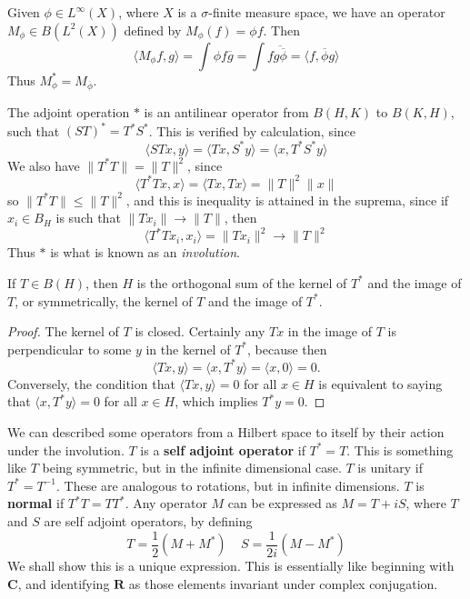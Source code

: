 \begin{example}
    Given $\phi \in L^\infty(X)$, where $X$ is a $\sigma$-finite measure space, we have an operator $M_\phi \in B(L^2(X))$ defined by $M_\phi(f) = \phi f$. Then
    \[ \langle M_\phi f, g \rangle = \int \phi f \overline{g} = \int f \overline{g \overline{\phi}} = \langle f, \overline{\phi} g \rangle \]
    Thus $M_\phi^* = M_{\overline{\phi}}$.
\end{example}

The adjoint operation $*$ is an antilinear operator from $B(H,K)$ to $B(K,H)$, such that $(ST)^* = T^*S^*$. This is verified by calculation, since
%
\[ \langle ST x, y \rangle = \langle Tx, S^* y \rangle = \langle x, T^*S^* y \rangle \]
%
We also have $\| T^*T \| = \| T \|^2$, since
%
\[ \langle T^*T x, x \rangle = \langle Tx, Tx \rangle = \| T \|^2 \| x \| \]
%
so $\| T^*T \| \leq \| T \|^2$, and this is inequality is attained in the suprema, since if $x_i \in B_H$ is such that $\| T x_i \| \to \| T \|$, then
%
\[ \langle T^*T x_i, x_i \rangle = \| T x_i \|^2 \to \| T \|^2 \]
%
Thus $*$ is what is known as an \emph{involution}.

\begin{theorem}
    If $T \in B(H)$, then $H$ is the orthogonal sum of the kernel of $T^*$ and the image of $T$, or symmetrically, the kernel of $T$ and the image of $T^*$.
\end{theorem}
\begin{proof}
    The kernel of $T$ is closed. Certainly any $Tx$ in the image of $T$ is perpendicular to some $y$ in the kernel of $T^*$, because then
    \[ \langle Tx, y \rangle = \langle x, T^* y \rangle = \langle x, 0 \rangle = 0. \]
    Conversely, the condition that $\langle Tx, y \rangle = 0$ for all $x \in H$ is equivalent to saying that $\langle x, T^* y \rangle = 0$ for all $x \in H$, which implies $T^* y = 0$.
\end{proof}

We can described some operators from a Hilbert space to itself by their action under the involution. $T$ is a {\bf self adjoint operator} if $T^* = T$. This is something like $T$ being symmetric, but in the infinite dimensional case. $T$ is unitary if $T^* = T^{-1}$. These are analogous to rotations, but in infinite dimensions. $T$ is {\bf normal} if $T^*T = TT^*$. Any operator $M$ can be expressed as $M = T + iS$, where $T$ and $S$ are self adjoint operators, by defining
%
\[ T = \frac{1}{2}(M + M^*)\ \ \ \ \ S = \frac{1}{2i}(M - M^*) \]
%
We shall show this is a unique expression. This is essentially like beginning with $\mathbf{C}$, and identifying $\mathbf{R}$ as those elements invariant under complex conjugation.

